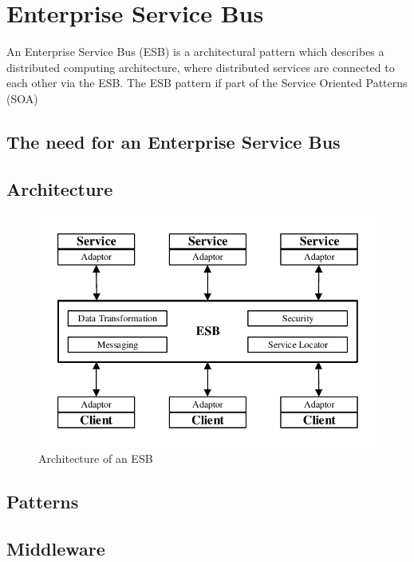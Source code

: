 \chapter{Enterprise Service Bus}
\label{cha:esb}
An Enterprise Service Bus (ESB) is a architectural pattern which describes a distributed computing architecture, where distributed services are connected to each other via the ESB. The ESB pattern if part of the Service Oriented Patterns (SOA)  

\section{The need for an Enterprise Service Bus}
\label{sec:esb-need-for-esb}

\section{Architecture}
\label{sec:esb-architecture}

\begin{figure}[htbp]
	\centering
	\includegraphics[scale=1]{images/esb-simple-architecture.pdf}
	\caption{Architecture of an ESB}
	\label{fig:esb-simple-architecture}
\end{figure} 

\section{Patterns}
\label{sec:esb-patterns}

\section{Middleware}
\label{sec:esb-middleware}